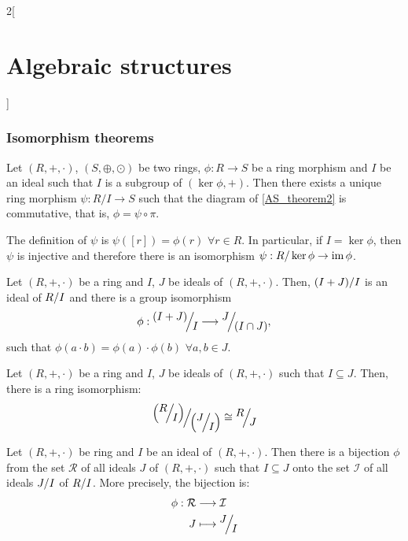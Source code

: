 \documentclass[../../../main.tex]{subfiles}
\begin{document}
\begin{multicols}{2}[\section{Algebraic structures}]
    \subsubsection{Isomorphism theorems}
    \begin{theorem}
        Let $(R,+,\cdot)$, $(S,\oplus,\odot)$ be two rings, $\phi:R\rightarrow S$ be a ring morphism and $I$ be an ideal such that $I$ is a subgroup of $(\ker\phi,+)$. Then there exists a unique ring morphism $\psi:R/I\rightarrow S$ such that the diagram of \cref{AS_theorem2} is commutative, that is, $\phi=\psi\circ\pi$.
        \begin{center}
            \begin{minipage}{\linewidth}
                \centering
                
                \label{AS_theorem2}
            \end{minipage}
        \end{center}
        The definition of $\psi$ is $\psi([r])=\phi(r)$ $\forall r\in R$.
        In particular, if $I=\ker\phi$, then $\psi$ is injective and therefore there is an isomorphism $\psi:R/\ker\phi\rightarrow\operatorname{im}\phi$.
    \end{theorem}
    \begin{theorem}
        Let $(R,+,\cdot)$ be a ring and $I$, $J$ be ideals of $(R,+,\cdot)$. Then, $\quot{(I+J)}{I}$ is an ideal of $\quot{R}{I}$ and there is a group isomorphism
        $$\phi:\quot{(I+J)}{I}\longrightarrow\quot{J}{(I\cap J)},$$ such that $\phi(a\cdot b)=\phi(a)\cdot\phi(b)$ $\forall a,b\in J$.
    \end{theorem}
    \begin{theorem}
        Let $(R,+,\cdot)$ be a ring and $I$, $J$ be ideals of $(R,+,\cdot)$ such that $I\subseteq J$. Then, there is a ring isomorphism:
        $$\quot{\left(\quot{R}{I}\right)}{\left(\quot{J}{I}\right)}\cong\quot{R}{J}$$
    \end{theorem}
    \begin{theorem}
        Let $(R,+,\cdot)$ be ring and $I$ be an ideal of $(R,+,\cdot)$. Then there is a bijection $\phi$ from the set $\mathcal{R}$ of all ideals $J$ of $(R,+,\cdot)$ such that $I\subseteq J$ onto the set $\mathcal{I}$ of all ideals $\quot{J}{I}$ of $\quot{R}{I}$. More precisely, the bijection is:
        \begin{align*}
            \phi:\mathcal{R} & \longrightarrow\mathcal{I} \\
            J                & \longmapsto\quot{J}{I}
        \end{align*}
    \end{theorem}

\end{multicols}
\end{document}
